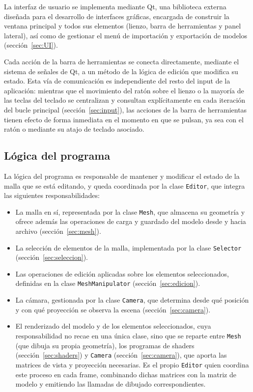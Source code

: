 La interfaz de usuario se implementa mediante Qt, una biblioteca externa diseñada para el desarrollo de interfaces gráficas, encargada de construir la ventana principal y todos sus elementos (lienzo, barra de herramientas y panel lateral), así como de gestionar el menú de importación y exportación de modelos (sección~\ref{sec:UI}).

Cada acción de la barra de herramientas se conecta directamente, mediante el sistema de señales de Qt, a un método de la lógica de edición que modifica su estado. Esta vía de comunicación es independiente del resto del input de la aplicación: mientras que el movimiento del ratón sobre el lienzo o la mayoría de las teclas del teclado se centralizan y consultan explícitamente en cada iteración del bucle principal (sección~\ref{sec:input}), las acciones de la barra de herramientas tienen efecto de forma inmediata en el momento en que se pulsan, ya sea con el ratón o mediante su atajo de teclado asociado.

\subsection{Lógica del programa}

La lógica del programa es responsable de mantener y modificar el estado de la malla que se está editando, y queda coordinada por la clase \texttt{Editor}, que integra las siguientes responsabilidades:

\begin{itemize}
    \item La malla en sí, representada por la clase \texttt{Mesh}, que almacena su geometría y ofrece además las operaciones de carga y guardado del modelo desde y hacia archivo (sección~\ref{sec:mesh}).
    \item La selección de elementos de la malla, implementada por la clase \texttt{Selector} (sección~\ref{sec:seleccion}).
    \item Las operaciones de edición aplicadas sobre los elementos seleccionados, definidas en la clase \texttt{MeshManipulator} (sección~\ref{sec:edicion}).
    \item La cámara, gestionada por la clase \texttt{Camera}, que determina desde qué posición y con qué proyección se observa la escena (sección~\ref{sec:camera}).
    \item El renderizado del modelo y de los elementos seleccionados, cuya responsabilidad no recae en una única clase, sino que se reparte entre \texttt{Mesh} (que dibuja su propia geometría), los programas de shaders (sección~\ref{sec:shaders}) y \texttt{Camera} (sección~\ref{sec:camera}), que aporta las matrices de vista y proyección necesarias. Es el propio \texttt{Editor} quien coordina este proceso en cada frame, combinando dichas matrices con la matriz de modelo y emitiendo las llamadas de dibujado correspondientes.
\end{itemize}


